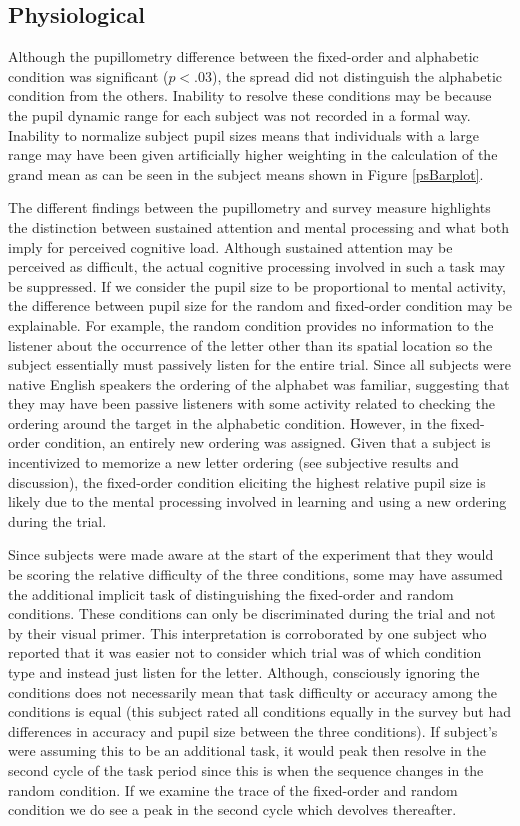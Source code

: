 \documentclass[10pt]{article}
\begin{document}
\subsection{Physiological}

Although the pupillometry difference between the fixed-order
and alphabetic condition was significant ($p<.03$), the spread
did not distinguish the alphabetic condition from the others.
Inability to resolve these conditions may be because the pupil
dynamic range for each subject was not recorded in a formal
way. Inability to normalize subject pupil sizes means that
individuals with a large range may have been given
artificially higher weighting in the calculation of the grand
mean as can be seen in the subject means shown in Figure
\ref{psBarplot}.

The different findings between the pupillometry and survey measure
highlights the distinction between sustained attention and
mental processing and what both imply for perceived cognitive
load.  Although sustained attention may be perceived as
difficult, the actual cognitive processing involved in such a
task may be suppressed.
If we consider the pupil size to be proportional to mental
activity, the difference between pupil size for the random and
fixed-order condition may be explainable.  For example, the
random condition provides no information to the listener about
the occurrence of the letter other than its spatial location
so the subject essentially must passively listen for the
entire trial.  Since all subjects were native English speakers
the ordering of the alphabet was familiar, suggesting that
they may have been passive listeners with some activity
related to checking the ordering around the target in the
alphabetic condition.  However, in the fixed-order condition,
an entirely new ordering was assigned. Given that
a subject is incentivized to memorize a new letter ordering
(see subjective results and discussion), the fixed-order
condition eliciting the highest relative pupil size 
is likely due to the mental processing involved
in learning and using a new ordering during the trial.  

Since subjects were made aware at the start of the experiment
that they would be scoring the relative difficulty of the
three conditions, some may have assumed the additional
implicit task of distinguishing the fixed-order and random
conditions. These conditions can only be discriminated during
the trial and not by their visual primer.  This interpretation
is corroborated by one subject who reported that it was easier
not to consider which trial was of which condition type and
instead just listen for the letter.  Although, consciously
ignoring the conditions does not necessarily mean that task
difficulty or accuracy among the conditions is equal (this
subject rated all conditions equally in the survey but had
differences in accuracy and pupil size between the three
conditions).  If subject's were assuming this to be an
additional task, it would peak then resolve in the second
cycle of the task period since this is when the sequence
changes in the random condition.  If we examine the trace of
the fixed-order and random condition we do see a peak in the
second cycle which devolves thereafter.
\end{document}
